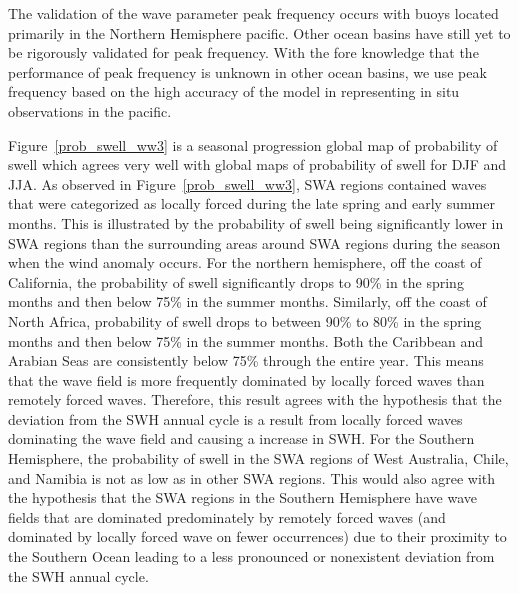 \documentclass[12pt,twoside]{article}
\begin{document}
The validation of the wave parameter peak frequency occurs with buoys located primarily in the Northern Hemisphere pacific. Other ocean basins have still yet to be rigorously validated for peak frequency. With the fore knowledge that the performance of peak frequency is unknown in other ocean basins, we use peak frequency based on the high accuracy of the model in representing in situ observations in the pacific. 



Figure~\ref{prob_swell_ww3} is a seasonal progression global map of probability of swell which agrees very well with \citet{semedo2011global} global maps of probability of swell for DJF and JJA. As observed in Figure~\ref{prob_swell_ww3}, SWA regions contained waves that were categorized as locally forced during the late spring and early summer months. This is illustrated by the probability of swell being significantly lower in SWA regions than the surrounding areas around SWA regions during the season when the wind anomaly occurs. For the northern hemisphere, off the coast of California, the probability of swell significantly drops to 90\% in the spring months and then below 75\% in the summer months. Similarly, off the coast of North Africa, probability of swell drops to between 90\% to 80\% in the spring months and then below 75\% in the summer months. Both the Caribbean and Arabian Seas are consistently below 75\% through the entire year. This means that the wave field is more frequently dominated by locally forced waves than remotely forced waves. Therefore, this result agrees with the hypothesis that the deviation from the SWH annual cycle is a result from locally forced waves dominating the wave field and causing a increase in SWH. For the Southern Hemisphere, the probability of swell in the SWA regions of West Australia, Chile, and Namibia is not as low as in other SWA regions. This would also agree with the hypothesis that the SWA regions in the Southern Hemisphere have wave fields that are dominated predominately by remotely forced waves (and dominated by locally forced wave on fewer occurrences) due to their proximity to the Southern Ocean leading to a less pronounced or nonexistent deviation from the SWH annual cycle. 
\end{document}
